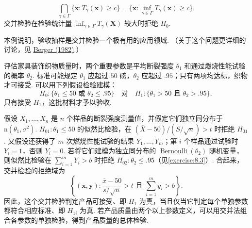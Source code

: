 $$\bigcap_{\gamma\in\Gamma}\{\boldsymbol x:T_\gamma(\boldsymbol x)\ge c\}
=\{\boldsymbol x:\inf_{\gamma\in\Gamma}T_\gamma(\boldsymbol x)\ge c\}.$$
交并检验在检验统计量 $\inf_{\gamma\in\Gamma}T_\gamma(\boldsymbol X)$ 较大时拒绝 $H_0$.
\begin{example}[验收抽样]\label{ex:8.2.9}
本例说明，验收抽样是交并检验一个极有用的应用领域. （关于这个问题更详细的讨论，见 \hyperref[bib:source23]{Berger (1982)}.）

评估家具装饰织物质量时，两个重要参数是平均断裂强度 $\theta_1$ 和通过燃烧性能试验的概率 $\theta_2$. 标准可能规定 $\theta_1$ 应超过 $50$ 磅，$\theta_2$ 应超过 $.95$；只有两项均达标，织物才可接受. 可以用下列假设检验建模：
$$H_0:\{\theta_1\le50\text{ 或 }\theta_2\le.95\}\quad\text{对}\quad
H_1:\{\theta_1>50\text{ 且 }\theta_2>.95\},$$
只有接受 $H_1$，这批材料才予以验收.

假设 $X_1,\ldots,X_n$ 是 $n$ 个样品的断裂强度测量值，并假定它们独立同分布于 $\mathrm n(\theta_1,\sigma^2)$. $H_{01}:\theta_1\le50$ 的似然比检验，在 $(\bar X-50)/(S/\sqrt n)>t$ 时拒绝 $H_{01}$. 又假设还获得了 $m$ 次燃烧性能试验的结果 $Y_1,\ldots,Y_m$；第 $i$ 个样品通过试验时 $Y_i=1$，否则 $Y_i=0$. 若将它们建模为独立同分布的 $\operatorname{Bernoulli}(\theta_2)$ 随机变量，则似然比检验在 $\sum_{i=1}^mY_i>b$ 时拒绝 $H_{02}:\theta_2\le.95$（见\autoref{exercise:8.3}\mbox{）.} 合起来，交并检验的拒绝域为
$$\left\{(\boldsymbol x,\boldsymbol y):\frac{\bar x-50}{s/\sqrt n}>t\text{ 且 }\sum_{i=1}^my_i>b\right\}.$$
因此，这个交并检验判定产品可接受、即 $H_1$ 为真，当且仅当它判定每个单独参数都符合相应标准、即 $H_{1i}$ 为真. 若产品质量由两个以上参数定义，可以用交并法组合各参数的单独检验，得到产品质量的总体检验.
\end{example}
